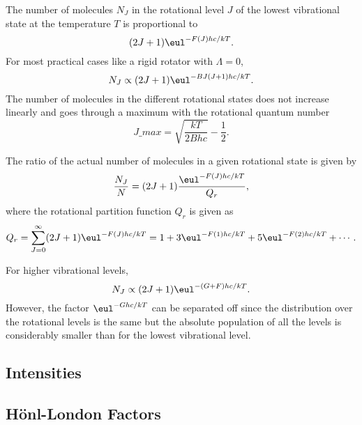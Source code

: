 The number of molecules $N_{J}$ in the rotational level $J$ of the lowest vibrational state at the temperature $T$ is proportional to
\begin{equation*}
    (2J + 1)\eul^{-F(J)hc/kT}.
\end{equation*}
For most practical cases like a rigid rotator with $\Lambda = 0$,
\begin{equation*}
    N_{J} \propto (2J + 1)\eul^{-BJ(J + 1)hc/kT}.
\end{equation*}
The number of molecules in the different rotational states does not increase linearly and goes through a maximum with the rotational quantum number
\begin{equation*}
    J\_{max} = \sqrt{\frac{kT}{2Bhc}} - \frac{1}{2}.
\end{equation*}

The ratio of the actual number of molecules in a given rotational state is given by
\begin{equation*}
    \frac{N_{J}}{N} = (2J + 1)\frac{\eul^{-F(J)hc/kT}}{Q_{r}},
\end{equation*}
where the rotational partition function $Q_{r}$ is given as
\begin{equation}
    Q_{r} = \sum_{J=0}^{\infty}(2J + 1)\eul^{-F(J)hc/kT} = 1 + 3\eul^{-F(1)hc/kT} + 5\eul^{-F(2)hc/kT} + \dotsb.
\end{equation}

For higher vibrational levels,
\begin{equation}
    N_{J} \propto (2J + 1)\eul^{-(G + F)hc/kT}.
\end{equation}
However, the factor $\eul^{-Ghc/kT}$ can be separated off since the distribution over the rotational levels is the same but the absolute population of all the levels is considerably smaller than for the lowest vibrational level.

\subsection{Intensities}

\subsection{H\"onl-London Factors}

